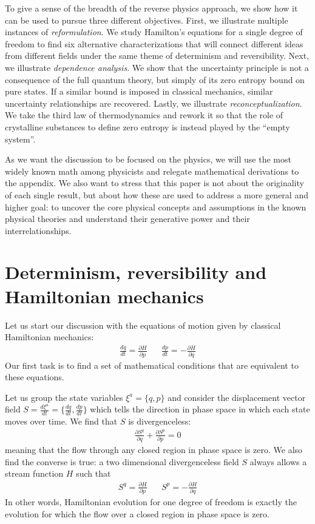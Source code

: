 \documentclass[10pt,twocolumn, nofootinbib]{revtex4-2}
\begin{document}
To give a sense of the breadth of the reverse physics approach, we show how it can be used to pursue three different objectives. First, we illustrate multiple instances of \emph{reformulation}. We study Hamilton's equations for a single degree of freedom to find six alternative characterizations that will connect different ideas from different fields under the same theme of determinism and reversibility. Next, we illustrate \emph{dependence analysis}. We show that the uncertainty principle is not a consequence of the full quantum theory, but simply of its zero entropy bound on pure states. If a similar bound is imposed in classical mechanics, similar uncertainty relationships are recovered. Lastly, we illustrate \emph{reconceptualization}. We take the third law of thermodynamics and rework it so that the role of crystalline substances to define zero entropy is instead played by the ``empty system''.

As we want the discussion to be focused on the physics, we will use the most widely known math among physicists and relegate mathematical derivations to the appendix. We also want to stress that this paper is not about the originality of each single result, but about how these are used to address a more general and higher goal: to uncover the core physical concepts and assumptions in the known physical theories and understand their generative power and their interrelationships. 


\section{Determinism, reversibility and Hamiltonian mechanics}

Let us start our discussion with the equations of motion given by classical Hamiltonian mechanics:
\begin{align}\label{HamiltonEquations1}
	\frac{dq}{dt} = \frac{\partial H}{\partial p} \; \; \; \; \; \; \frac{dp}{dt} = - \frac{\partial H}{\partial q}
\end{align}
Our first task is to find a set of mathematical conditions that are equivalent to these equations.

Let us group the state variables $\xi^a = \{q, p\}$ and consider the displacement vector field $S = \frac{d\xi^a}{dt} = \{ \frac{dq}{dt}, \frac{dp}{dt} \} $ which tells the direction in phase space in which each state moves over time. We find that $S$ is divergenceless:
\begin{align}\label{divergenceless}
\frac{\partial S^q}{\partial q} + \frac{\partial S^p}{\partial p} =0
\end{align}
meaning that the flow through any closed region in phase space is zero. We also find the converse is true: a two dimensional divergenceless field $S$ always allows a stream function $H$ such that
\begin{align}
	S^q = \frac{\partial H}{\partial p} \; \; \; \; \; \; S^p = - \frac{\partial H}{\partial q}
\end{align}
In other words, Hamiltonian evolution for one degree of freedom is exactly the evolution for which the flow over a closed region in phase space is zero.
\end{document}
